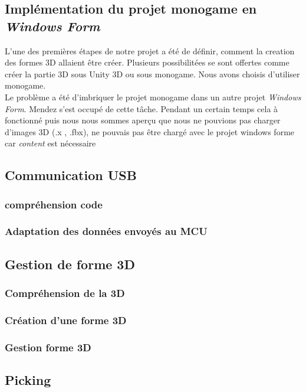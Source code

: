 \documentclass[a4paper,12pt]{article}
\begin{document}
\subsection{Implémentation du projet monogame en \textit{Windows Form}}

L'une des premières étapes de notre projet a été de définir, comment la creation des formes 3D allaient être créer. Plusieurs possibilitées se sont offertes comme créer la partie 3D sous Unity 3D ou sous monogame. Nous avons choisis d'utiliser monogame. \\

Le problème a été d'imbriquer le projet monogame dans un autre projet \textit{Windows Form}. Mendez s'est occupé de cette tâche. Pendant un certain temps cela à fonctionné puis nous nous sommes aperçu que nous ne pouvions pas charger d'images 3D (.x , .fbx), ne pouvais pas être chargé avec le projet windows forme car \textit{content} est nécessaire

\subsection{Communication USB}
\subsubsection{compréhension code}
\subsubsection{Adaptation des données envoyés au MCU}
\subsection{Gestion de forme 3D}

\subsubsection{Compréhension de la 3D}
\subsubsection{Création d'une forme 3D}
\subsubsection{Gestion forme 3D}
\subsection{Picking}
\end{document}
